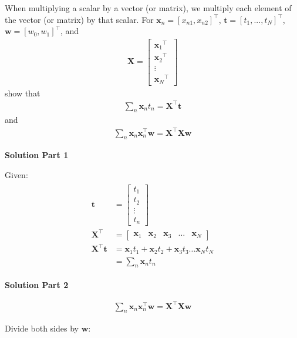 \documentclass[10pt]{article}
\begin{document}
\begin{enumerate}
When multiplying a scalar by a vector (or matrix), we multiply each element of the vector (or matrix) by that scalar.  For $\mathbf{x}_n = {[ x_{n1}, x_{n2} ]}^\top$, $\mathbf{t} = {[ t_1,...,t_N ]}^\top$, $\mathbf{w} = {[ w_0, w_1 ]}^\top$, and
\begin{eqnarray*}
\mathbf{X} = 
    \begin{bmatrix}
    {\mathbf{x}_{1}}^\top \\[0.3em]
    {\mathbf{x}_{2}}^\top \\[0.3em]
    \vdots \\[0.3em]
    {\mathbf{x}_{N}}^\top
    \end{bmatrix}
\end{eqnarray*}
show that
\begin{eqnarray*}
\sum_{n} \mathbf{x}_n t_n = \mathbf{X}^\top\mathbf{t}
\end{eqnarray*}
and
\begin{eqnarray*}
\sum_{n} \mathbf{x}_n \mathbf{x}_n ^\top \mathbf{w} = \mathbf{X}^\top\mathbf{X} \mathbf{w}
\end{eqnarray*}

{\bf Solution Part 1}

Given: 
\begin{eqnarray*}
\begin{aligned}
	\mathbf{t} &=
	\begin{bmatrix}
	t_1 \\
	t_2 \\
	\vdots \\
	t_n
	\end{bmatrix}
	\\
	\mathbf{X}^\top &= \begin{bmatrix} \mathbf{x}_1 & \mathbf{x}_2 & \mathbf{x}_3 & \dots & \mathbf{x}_N \end{bmatrix}
	\\
	\mathbf{X}^\top\mathbf{t} &= \mathbf{x}_1 t_1 + \mathbf{x}_2 t_2 + \mathbf{x}_3 t_3 \dots \mathbf{x}_N t_N
	\\
	&= \sum_n \mathbf{x}_n t_n
\end{aligned}
\end{eqnarray*}

{\bf Solution Part 2}

\begin{eqnarray*}
\sum_{n} \mathbf{x}_n \mathbf{x}_n ^\top \mathbf{w} = \mathbf{X}^\top\mathbf{X} \mathbf{w}
\end{eqnarray*}

Divide both sides by $\mathbf{w}$:


\end{enumerate}
\end{document}
